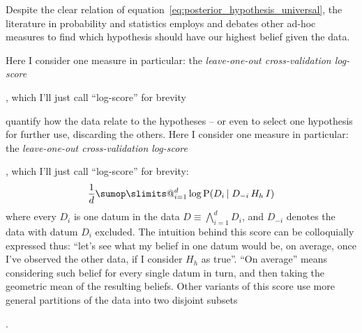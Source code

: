 \documentclass[\ifafour a4paper,12pt,\else a5paper,10pt,\fi%
onecolumn,oneside,article,%
british%
]{memoir}
\makeatletter
\theoremstyle{remark}
\theoremstyle{innote}
\def\sum{\DOTSI\sumop\slimits@}
\newcommand*{\Land}{\bigwedge}
\newcommand*{\p}{\mathrm{P}}%
\renewcommand*{\|}[1][]{\nonscript\,#1\vert\nonscript\;\mathopen{}}
\newcommand*{\yK}{I}
\makeatother
\begin{document}
Despite the clear relation of
equation~\eqref{eq:posterior_hypothesis_universal}, the literature in
probability and statistics employs and debates other ad-hoc measures to
find which hypothesis should have our highest belief given the data.

Here I consider one measure in particular: the \emph{leave-one-out
  cross-validation log-score}\addtocounter{footnote}{-1}\footnotemark{},
which I'll just call \enquote{log-score} for brevity




quantify how the data relate to the hypotheses -- or even to select one
hypothesis for further use, discarding the others.
Here I consider one measure in particular: the \emph{leave-one-out
  cross-validation log-score}\addtocounter{footnote}{-1}\footnotemark{},
which I'll just call \enquote{log-score} for brevity:
\begin{equation}
  \label{eq:log-score}
  \frac{1}{d} \sum_{i=1}^{d} \log\p(D_{i} \| D_{-i} \, H_{h} \, \yK)
\end{equation}
where every $D_{i}$ is one datum in the data $D \equiv \Land_{i=1}^{d} D_{i}$,
and $D_{-i}$ denotes the data with datum $D_{i}$ excluded. The intuition
behind this score can be colloquially expressed thus: \enquote{let's see
  what my belief in one datum would be, on average, once I've observed the
  other data, if I consider $H_{h}$ as true}. \enquote{On average} means
considering such belief for every single datum in turn, and then taking the
geometric mean of the resulting
beliefs. %
Other variants of this score use more general partitions of the data into
two disjoint subsets\addtocounter{footnote}{-1}\footnotemark{}.
\end{document}

